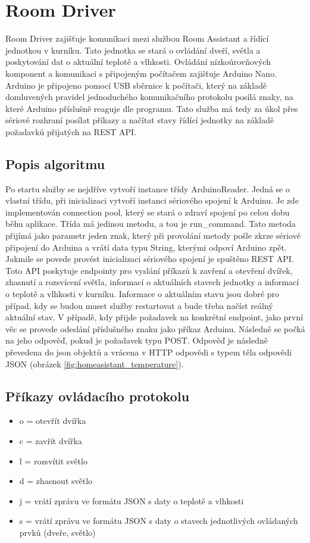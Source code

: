 \section{Room Driver}\label{sec:room-driver}
Room Driver zajišťuje komunikaci mezi službou Room Assistant a řídící jednotkou v kurníku.
Tato jednotka se stará o ovládání dveří, světla a poskytování dat o aktuální teplotě a vlhkosti.
Ovládání nízkoúrovňových komponent a komunikaci s připojeným počítačem zajišťuje Arduino Nano.
Arduino je připojeno pomocí USB sběrnice k počítači, který na základě domluvených pravidel jednoduchého komunikačního protokolu posílá znaky, na které Arduino příslušně reaguje dle programu.
Tato služba má tedy za úkol přes sériové rozhraní posílat příkazy a načítat stavy řídící jednotky na základě požadavků přijatých na REST API.

\subsection*{Popis algoritmu}
Po startu služby se nejdříve vytvoří instance třídy ArduinoReader.
Jedná se o vlastní třídu, při inicializaci vytvoří instanci sériového spojení k Arduinu.
Je zde implementován connection pool, který se stará o zdraví spojení po celou dobu běhu aplikace.
Třída má jedinou metodu, a tou je run\_command.
Tato metoda přijímá jako parametr jeden znak, který při provolání metody pošle zkrze sériové připojení do Arduina a vrátí data typu String, kterými odpoví Arduino zpět.
Jakmile se povede provést inicializaci sériového spojení je spuštěno REST API.
Toto API poskytuje endpointy pro vyslání příkazů k zavření a otevření dvířek, zhasnutí a rozsvícení světla, informací o aktuálních stavech jednotky a informací o teplotě a vlhkosti v kurníku.
Informace o aktuálním stavu jsou dobré pro případ, kdy se budou muset služby restartovat a bude třeba načíst reálný aktuální stav.
V případě, kdy přijde požadavek na konkrétní endpoint, jako první věc se provede odeslání příslušného znaku jako příkaz Arduinu.
Následně se počká na jeho odpověď, pokud je požadavek typu POST.
Odpověď je následně převedena do \gls{json} objektů a vrácena v HTTP odpovědi s typem těla odpovědi JSON (obrázek \ref{fig:homeasistant_temperature}).

\subsection*{Příkazy ovládacího protokolu}
\begin{itemize}
    \item o = otevřít dvířka
    \item c = zavřít dvířka
    \item l = rozsvítit světlo
    \item d = zhasnout světlo
    \item j = vrátí zprávu ve formátu JSON s daty o teplotě a vlhkosti
    \item s = vrátí zprávu ve formátu JSON s daty o stavech jednotlivých ovládaných prvků (dveře, světlo)
\end{itemize}





